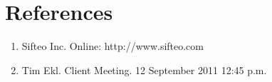 \documentclass[12pt]{article}
\begin{document}
\clearpage
\printglossaries
\clearpage

\section*{References}

        \begin{enumerate}
                \item{Sifteo Inc. Online: http://www.sifteo.com}
                \item{Tim Ekl.  Client Meeting.  12 September 2011 12:45 p.m.}
        \end{enumerate}

\printindex
\end{document}

